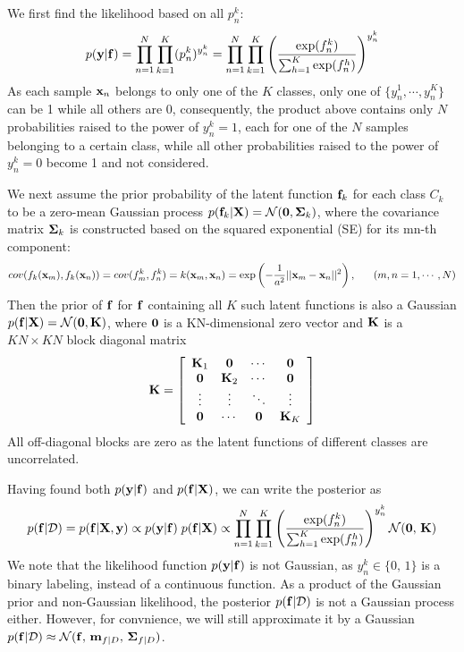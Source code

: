 \documentclass{article}
\begin{document}
We first find the likelihood based on all $p_n^k$:
\begin{equation}
  p({\bf y}|{\bf f})=\prod_{n=1}^N\prod_{k=1}^K (p_n^k)^{y_n^k}
  =\prod_{n=1}^N\prod_{k=1}^K 
  \left( \frac{\exp(f_n^k)}{\sum_{h=1}^K\exp(f_n^h)}\right)^{y_n^k}
\end{equation}
As each sample ${\bf x}_n$ belongs to only one of the $K$ classes, 
only one of $\{y_n^1,\cdots,y_n^K\}$ can be 1 while all others are
0, consequently, the product above contains only $N$ probabilities 
raised to the power of $y_n^k=1$, each for one of the $N$ samples
belonging to a certain class, while all other probabilities raised
to the power of $y_n^k=0$ become 1 and not considered.

We next assume the prior probability of the latent function 
${\bf f}_k$ for each class $C_k$ to be a zero-mean Gaussian 
process $p({\bf f}_k|{\bf X})={\cal N}({\bf 0},{\bf\Sigma}_k)$, 
where the covariance matrix ${\bf\Sigma}_k$ is constructed based
on the squared exponential (SE) for its mn-th component:
\begin{equation}
  cov(f_k({\bf x}_m),f_k({\bf x}_n))=cov(f^k_m,f^k_n)
  =k({\bf x}_m,{\bf x}_n)
  =\exp\left(-\frac{1}{a^2}||{\bf x}_m-{\bf x}_n||^2\right),
  \;\;\;\;\;\;(m,n=1,\cdots,N)
\end{equation}
Then the prior of ${\bf f}$ for ${\bf f}$ containing all 
$K$ such latent functions is also a Gaussian 
$p({\bf f}|{\bf X})={\cal N}({\bf 0},{\bf K})$, where ${\bf 0}$ 
is a KN-dimensional zero vector and ${\bf K}$ is a $KN \times KN$
block diagonal matrix
\begin{equation}
{\bf K}=\left[\begin{array}{cccc}{\bf K}_1 & {\bf 0} &\cdots &{\bf 0}\\
    {\bf 0} & {\bf K}_2 & \cdots & {\bf 0}\\
    \vdots & \vdots & \ddots & \vdots \\
    {\bf 0} & \cdots & {\bf 0} &{\bf K}_K\end{array}\right]
\end{equation}
All off-diagonal blocks are zero as the latent functions of 
different classes are uncorrelated. 

Having found both $p({\bf y}|{\bf f})$ and $p({\bf f}|{\bf X})$,
we can write the posterior as
\begin{equation}
  p({\bf f}|{\cal D})
  =p({\bf f}|{\bf X},{\bf y})\propto p({\bf y}|{\bf f})\; p({\bf f}|{\bf X})
  \propto\prod_{n=1}^N\prod_{k=1}^K 
  \left( \frac{\exp(f_n^k)}{\sum_{h=1}^K\exp(f_n^h)} \right)^{y_n^k} 
       {\cal N}({\bf 0},\,{\bf K})
\end{equation}
We note that the likelihood function $p({\bf y}|{\bf f})$ is not
Gaussian, as $y_n^k \in\{0,\,1\}$ is a binary labeling, instead 
of a continuous function. As a product of the Gaussian prior and
non-Gaussian likelihood, the posterior $p({\bf f}|{\cal D})$ is
not a Gaussian process either. However, for convnience, we will 
still approximate it by a Gaussian
$p({\bf f}|{\cal D})\approx {\cal N}({\bf f},\,{\bf m}_{f|D},\,{\bf\Sigma}_{f|D})$.
\end{document}
